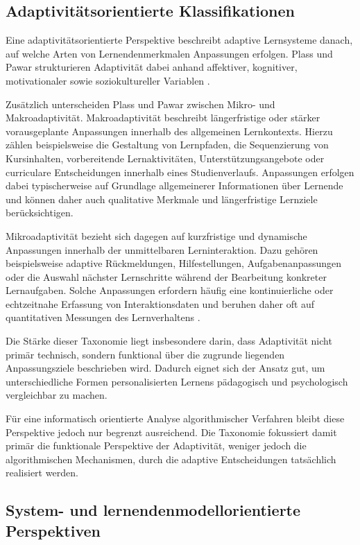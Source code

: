 \subsection{Adaptivitätsorientierte
Klassifikationen}\label{adaptivituxe4tsorientierte-klassifikationen}

Eine adaptivitätsorientierte Perspektive beschreibt adaptive Lernsysteme
danach, auf welche Arten von Lernendenmerkmalen Anpassungen erfolgen.
Plass und Pawar strukturieren Adaptivität dabei anhand affektiver,
kognitiver, motivationaler sowie soziokultureller Variablen
\citep{Plass2020}.

Zusätzlich unterscheiden Plass und Pawar zwischen Mikro- und
Makroadaptivität. Makroadaptivität beschreibt längerfristige oder
stärker vorausgeplante Anpassungen innerhalb des allgemeinen
Lernkontexts. Hierzu zählen beispielsweise die Gestaltung von
Lernpfaden, die Sequenzierung von Kursinhalten, vorbereitende
Lernaktivitäten, Unterstützungsangebote oder curriculare Entscheidungen
innerhalb eines Studienverlaufs. Anpassungen erfolgen dabei
typischerweise auf Grundlage allgemeinerer Informationen über Lernende
und können daher auch qualitative Merkmale und längerfristige Lernziele
berücksichtigen.

Mikroadaptivität bezieht sich dagegen auf kurzfristige und dynamische
Anpassungen innerhalb der unmittelbaren Lerninteraktion. Dazu gehören
beispielsweise adaptive Rückmeldungen, Hilfestellungen,
Aufgabenanpassungen oder die Auswahl nächster Lernschritte während der
Bearbeitung konkreter Lernaufgaben. Solche Anpassungen erfordern häufig
eine kontinuierliche oder echtzeitnahe Erfassung von Interaktionsdaten
und beruhen daher oft auf quantitativen Messungen des Lernverhaltens
\citep{Plass2020}.

Die Stärke dieser Taxonomie liegt insbesondere darin, dass Adaptivität
nicht primär technisch, sondern funktional über die zugrunde liegenden
Anpassungsziele beschrieben wird. Dadurch eignet sich der Ansatz gut, um
unterschiedliche Formen personalisierten Lernens pädagogisch und
psychologisch vergleichbar zu machen.

Für eine informatisch orientierte Analyse algorithmischer Verfahren
bleibt diese Perspektive jedoch nur begrenzt ausreichend. Die Taxonomie
fokussiert damit primär die funktionale Perspektive der Adaptivität,
weniger jedoch die algorithmischen Mechanismen, durch die adaptive
Entscheidungen tatsächlich realisiert werden.

\subsection{System- und lernendenmodellorientierte
Perspektiven}\label{system--und-lernendenmodellorientierte-perspektiven}

